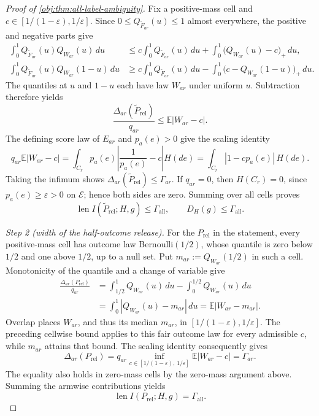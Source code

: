 \begin{proof}[Proof of \cref{obj:thm:all-label-ambiguity}]
Fix a positive-mass cell and \(c\in[1/(1-\varepsilon),1/\varepsilon]\). Since \(0\le Q_{\widetilde F_{ar}}(u)\le1\) almost everywhere, the positive and negative parts give
\[
\begin{aligned}
\int_0^1 Q_{\widetilde F_{ar}}(u)Q_{W_{ar}}(u)\,du
&\le c\int_0^1Q_{\widetilde F_{ar}}(u)\,du
   +\int_0^1\bigl(Q_{W_{ar}}(u)-c\bigr)_+\,du,\\
\int_0^1 Q_{\widetilde F_{ar}}(u)Q_{W_{ar}}(1-u)\,du
&\ge c\int_0^1Q_{\widetilde F_{ar}}(u)\,du
   -\int_0^1\bigl(c-Q_{W_{ar}}(1-u)\bigr)_+\,du.
\end{aligned}
\]
The quantiles at \(u\) and \(1-u\) each have law \(W_{ar}\) under uniform \(u\). Subtraction therefore yields
\[
\frac{\Delta_{ar}(\widetilde P_{\mathrm{rel}})}{q_{ar}}
\le \mathbb E|W_{ar}-c|.
\]
The defining score law of \(E_{ar}\) and \(p_a(e)>0\) give the scaling identity
\[
q_{ar}\mathbb E|W_{ar}-c|
=\int_{C_r}p_a(e)\left|\frac1{p_a(e)}-c\right|H(de)
=\int_{C_r}|1-cp_a(e)|\,H(de).
\]
Taking the infimum shows \(\Delta_{ar}(\widetilde P_{\mathrm{rel}})\le\Gamma_{ar}\). If \(q_{ar}=0\), then \(H(C_r)=0\), since \(p_a(e)\ge\varepsilon>0\) on \(\mathcal E\); hence both sides are zero. Summing over all cells proves
\[
\operatorname{len}I(\widetilde P_{\mathrm{rel}};H,g)
\le\Gamma_{\mathrm{all}},
\qquad D_H(g)\le\Gamma_{\mathrm{all}}.
\]

\textit{Step 2 (width of the half-outcome release).}
For the \(P_{\mathrm{rel}}\) in the statement, every positive-mass cell has outcome law Bernoulli\((1/2)\), whose quantile is zero below \(1/2\) and one above \(1/2\), up to a null set. Put \(m_{ar}:=Q_{W_{ar}}(1/2)\) in such a cell. Monotonicity of the quantile and a change of variable give
\[
\begin{aligned}
\frac{\Delta_{ar}(P_{\mathrm{rel}})}{q_{ar}}
&=\int_{1/2}^1Q_{W_{ar}}(u)\,du
  -\int_0^{1/2}Q_{W_{ar}}(u)\,du\\
&=\int_0^1|Q_{W_{ar}}(u)-m_{ar}|\,du
 =\mathbb E|W_{ar}-m_{ar}|.
\end{aligned}
\]
Overlap places \(W_{ar}\), and thus its median \(m_{ar}\), in
\([1/(1-\varepsilon),1/\varepsilon]\). The preceding cellwise bound applies to this fair outcome law for every admissible \(c\), while \(m_{ar}\) attains that bound. The scaling identity consequently gives
\[
\Delta_{ar}(P_{\mathrm{rel}})
=q_{ar}\inf_{c\in[1/(1-\varepsilon),\,1/\varepsilon]}
       \mathbb E|W_{ar}-c|
=\Gamma_{ar}.
\]
The equality also holds in zero-mass cells by the zero-mass argument above. Summing the armwise contributions yields
\[
\operatorname{len}I(P_{\mathrm{rel}};H,g)
=\Gamma_{\mathrm{all}}.
\]


\end{proof}
